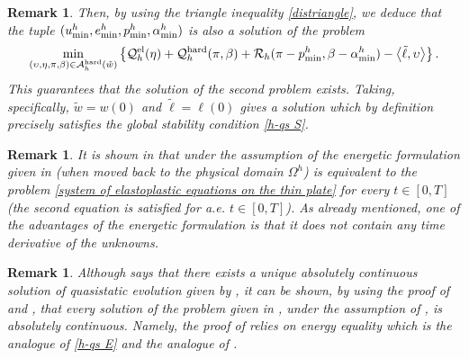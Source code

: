 \documentclass[reqno,10pt]{amsart}
\numberwithin{equation}{section}
\newtheorem{remark}[theorem]{Remark}
\theoremstyle{remark}
\newcommand{\RED}{\color{black}}
\newcommand{\BLACK}{\color{black}}
\newcommand{\calA}{\mathcal{A}}
\newcommand{\calQ}{\mathcal{Q}}
\newcommand{\calR}{\mathcal{R}}
\begin{document}
\begin{remark}
{Then, by using the triangle inequality \eqref{distriangle}, we deduce that the tuple $(u^h_{\rm min}, e^h_{\rm min}, p^h_{\rm min}, \alpha^h_{\rm min})$ is also a solution of the problem
\[
	\min_{(\upsilon, \eta, \pi, \beta) \in \calA_{h}^{\rm hard}(\tilde{w})}
	\left\{ 
	\calQ^{\rm el}_{h}(\eta) + \calQ^{\rm hard}_{h}(\pi, \beta) + \calR_{h}(\pi - p^h_{\rm min}, \beta - \alpha^h_{\rm min}) - \big\langle \tilde{\ell}, \upsilon  \big\rangle 
	\right\}.
\]
This guarantees that the solution of the second problem exists.
Taking, specifically, $\tilde{w} = w(0)$ and $\tilde{\ell} = \ell(0)$ gives a solution which by definition precisely satisfies the global stability condition \ref{h-qs S}.
\BLACK}
\end{remark}

\begin{remark} 
It is shown in \cite[Section 3.5]{Mielke.Roubicek.2015} that under the assumption of  the energetic formulation given in  (when moved back to the physical domain $\Omega^h$) is equivalent to the problem \eqref{system of elastoplastic equations on the thin plate} for every $t \in [0,T]$ (the second equation is satisfied for a.e. $t \in [0,T]$).
As already mentioned{\RED,\BLACK} one of the advantages of the energetic formulation is that it {\RED does not\BLACK} contain any time derivative of the unknowns. 
\end{remark}

\begin{remark} \label{improved convergence 1}
Although \cite[Theorem 3.5.2]{Mielke.Roubicek.2015} {\RED says\BLACK} that there exists a unique absolutely continuous solution of quasistatic evolution given by , it can be shown, by using the proof of \cite[Theorem 5.2]{DalMaso.DeSimone.Mora.2006} and , that every solution of the problem given in , under the assumption of , is absolutely continuous. Namely, the proof of \cite[Theorem 5.2]{DalMaso.DeSimone.Mora.2006} relies on energy equality which is the analogue of \ref{h-qs E} and the analogue of . 
\end{remark}
\end{document}
